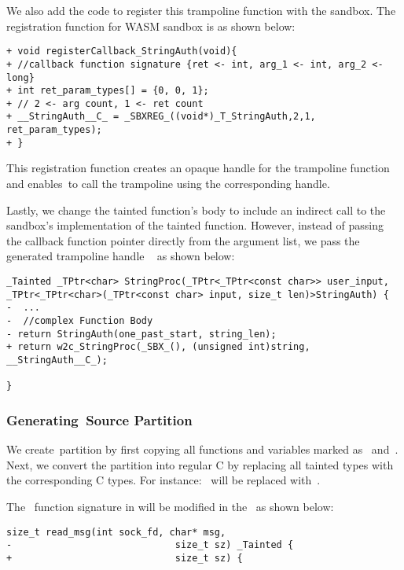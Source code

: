 We also add the code to register this trampoline function with the sandbox. The registration function for WASM sandbox is as shown below:
\begin{verbatim}
+ void registerCallback_StringAuth(void){
+ //callback function signature {ret <- int, arg_1 <- int, arg_2 <- long}
+ int ret_param_types[] = {0, 0, 1};
+ // 2 <- arg count, 1 <- ret count
+ __StringAuth__C_ = _SBXREG_((void*)_T_StringAuth,2,1, ret_param_types);
+ }
\end{verbatim}
This registration function creates an opaque handle for the trampoline function and enables~\ucregion to call the trampoline using the corresponding handle.

Lastly, we change the tainted function's body to include an indirect call to the sandbox's implementation of the tainted function. However, instead of passing the callback function pointer directly from the argument list, we pass the generated trampoline handle ~ as shown below:
\begin{verbatim}
_Tainted _TPtr<char> StringProc(_TPtr<_TPtr<const char>> user_input,
_TPtr<_TPtr<char>(_TPtr<const char> input, size_t len)>StringAuth) {
-  ...
-  //complex Function Body       
- return StringAuth(one_past_start, string_len);
+ return w2c_StringProc(_SBX_(), (unsigned int)string, __StringAuth__C_);

}
\end{verbatim}

\subsubsection{Generating~\ucregion Source Partition}
\label{subsubsec:genucregion}
We create~\ucregion partition by first copying all functions and variables marked as~ and~.
Next, we convert the partition into regular C by replacing all tainted types with the corresponding C types.
\newline
For instance:~ will be replaced with~.

The~ function signature in  will be modified in the ~\ucregion as shown below:
\begin{verbatim}
size_t read_msg(int sock_fd, char* msg,
-                             size_t sz) _Tainted {
+                             size_t sz) {
\end{verbatim}

